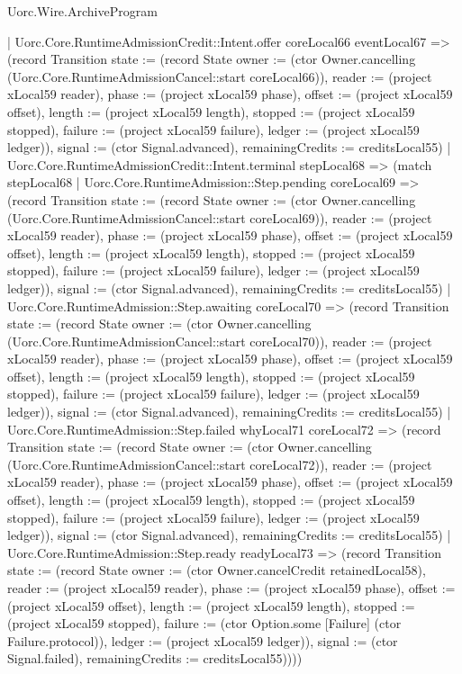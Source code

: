\begin{lexlean}{Uorc.Wire.ArchiveProgram}
\begin{semanticmodule}
{      | Uorc.Core.RuntimeAdmissionCredit::Intent.offer coreLocal66 eventLocal67 => (record Transition {state := (record State {owner := (ctor Owner.cancelling (Uorc.Core.RuntimeAdmissionCancel::start coreLocal66)), reader := (project xLocal59 reader), phase := (project xLocal59 phase), offset := (project xLocal59 offset), length := (project xLocal59 length), stopped := (project xLocal59 stopped), failure := (project xLocal59 failure), ledger := (project xLocal59 ledger)}), signal := (ctor Signal.advanced), remainingCredits := creditsLocal55})
      | Uorc.Core.RuntimeAdmissionCredit::Intent.terminal stepLocal68 => (match stepLocal68
        | Uorc.Core.RuntimeAdmission::Step.pending coreLocal69 => (record Transition {state := (record State {owner := (ctor Owner.cancelling (Uorc.Core.RuntimeAdmissionCancel::start coreLocal69)), reader := (project xLocal59 reader), phase := (project xLocal59 phase), offset := (project xLocal59 offset), length := (project xLocal59 length), stopped := (project xLocal59 stopped), failure := (project xLocal59 failure), ledger := (project xLocal59 ledger)}), signal := (ctor Signal.advanced), remainingCredits := creditsLocal55})
        | Uorc.Core.RuntimeAdmission::Step.awaiting coreLocal70 => (record Transition {state := (record State {owner := (ctor Owner.cancelling (Uorc.Core.RuntimeAdmissionCancel::start coreLocal70)), reader := (project xLocal59 reader), phase := (project xLocal59 phase), offset := (project xLocal59 offset), length := (project xLocal59 length), stopped := (project xLocal59 stopped), failure := (project xLocal59 failure), ledger := (project xLocal59 ledger)}), signal := (ctor Signal.advanced), remainingCredits := creditsLocal55})
        | Uorc.Core.RuntimeAdmission::Step.failed whyLocal71 coreLocal72 => (record Transition {state := (record State {owner := (ctor Owner.cancelling (Uorc.Core.RuntimeAdmissionCancel::start coreLocal72)), reader := (project xLocal59 reader), phase := (project xLocal59 phase), offset := (project xLocal59 offset), length := (project xLocal59 length), stopped := (project xLocal59 stopped), failure := (project xLocal59 failure), ledger := (project xLocal59 ledger)}), signal := (ctor Signal.advanced), remainingCredits := creditsLocal55})
        | Uorc.Core.RuntimeAdmission::Step.ready readyLocal73 => (record Transition {state := (record State {owner := (ctor Owner.cancelCredit retainedLocal58), reader := (project xLocal59 reader), phase := (project xLocal59 phase), offset := (project xLocal59 offset), length := (project xLocal59 length), stopped := (project xLocal59 stopped), failure := (ctor Option.some [Failure] (ctor Failure.protocol)), ledger := (project xLocal59 ledger)}), signal := (ctor Signal.failed), remainingCredits := creditsLocal55}))))
}
\end{semanticmodule}
\end{lexlean}
